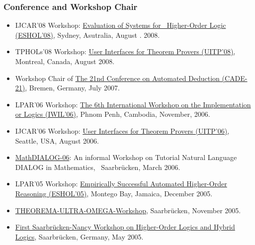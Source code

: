 \documentclass{letter}
\begin{document}
{{\subsubsection*{Conference and Workshop Chair}

\begin{itemize}
  \item IJCAR'08 Workshop: \href{http://www.cs.miami.edu/\~{
  }geoff/Conferences/ESHOL/}{Evaluation of Systems for \ Higher-Order Logic
  (ESHOL'08)}, Sydney, Asutralia, August . 2008.
  
  \item TPHOLs'08 Workshop: \href{http://www.ags.uni-sb.de/\~{
  }omega/workshops/UITP08/}{User Interfaces for Theorem Provers (UITP'08)},
  Montreal, Canada, August 2008.
  
  \item Workshop Chair of \href{http://www.cs.miami.edu/\~{
  }geoff/Conferences/CADE//Archive/CADE-21/}{The 21nd Conference on Automated
  Deduction (CADE-21)}, Bremen, Germany, July 2007.
  
  \item LPAR'06 Workshop: \href{http://www.cs.miami.edu/\~{
  }geoff/Conferences/IWIL-6/}{The 6th International Workshop on the
  Implementation or Logics (IWIL'06)}, Phnom Penh, Cambodia, November, 2006.
  
  \item IJCAR'06 Workshop:
  \href{http://www.easychair.org/FLoC-06/UITP.html}{User Interfaces for
  Theorem Provers (UITP'06)}, Seattle, USA, August 2006.
  
  \item \href{http://www.ags.uni-sb.de/\~{
  }omega/workshops/MathDIALOG06/}{MathDIALOG-06}: An informal Workshop on
  Tutorial Natural Language DIALOG in Mathematics, \ Saarbr\"ucken, March
  2006.
  
  \item LPAR'05 Workshop: \href{../ESHOL-05/website.html}{Empirically
  Successful Automated Higher-Order Reasoning (ESHOL'05)}, Montego Bay,
  Jamaica, December 2005.
  
  \item \href{http://www.ags.uni-sb.de/\~{
  }omega/workshops/TheoremaOmega05/}{THEOREMA-ULTRA-OMEGA-Workshop},
  Saarbr\"ucken, November 2005.
  
  \item \href{../HOL-HYL-WS-2005/website.html}{First Saarbr\"ucken-Nancy
  Workshop on Higher-Order Logics and Hybrid Logics}, Saarbr\"ucken, Germany,
  May 2005.
  

\end{itemize}}}
\end{document}
